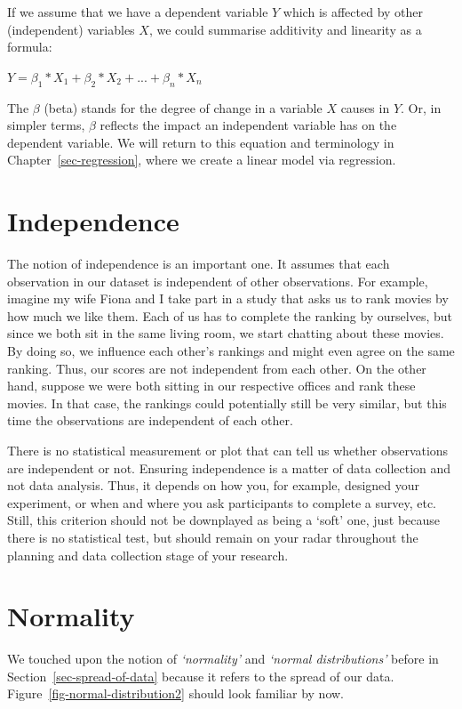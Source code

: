 \documentclass[
  letterpaper,
]{krantz}
\begin{document}
If we assume that we have a dependent variable \(Y\) which is affected
by other (independent) variables \(X\), we could summarise additivity
and linearity as a formula:

\label{linearity_additivity-formula}
\(Y = \beta_{1} * X_1 + \beta_{2} * X_{2} + ... + \beta_{n} * X_{n}\)

The \(\beta\) (beta) stands for the degree of change in a variable \(X\)
causes in \(Y\). Or, in simpler terms, \(\beta\) reflects the impact an
independent variable has on the dependent variable. We will return to
this equation and terminology in Chapter~\ref{sec-regression}, where we
create a linear model via regression.

\section{Independence}\label{sec-independence}

The notion of independence is an important one. It assumes that each
observation in our dataset is independent of other observations. For
example, imagine my wife Fiona and I take part in a study that asks us
to rank movies by how much we like them. Each of us has to complete the
ranking by ourselves, but since we both sit in the same living room, we
start chatting about these movies. By doing so, we influence each
other's rankings and might even agree on the same ranking. Thus, our
scores are not independent from each other. On the other hand, suppose
we were both sitting in our respective offices and rank these movies. In
that case, the rankings could potentially still be very similar, but
this time the observations are independent of each other.

There is no statistical measurement or plot that can tell us whether
observations are independent or not. Ensuring independence is a matter
of data collection and not data analysis. Thus, it depends on how you,
for example, designed your experiment, or when and where you ask
participants to complete a survey, etc. Still, this criterion should not
be downplayed as being a `soft' one, just because there is no
statistical test, but should remain on your radar throughout the
planning and data collection stage of your research.

\section{Normality}\label{sec-normality}

We touched upon the notion of \emph{`normality'} and \emph{`normal
distributions'} before in Section~\ref{sec-spread-of-data} because it
refers to the spread of our data. Figure~\ref{fig-normal-distribution2}
should look familiar by now.
\end{document}
